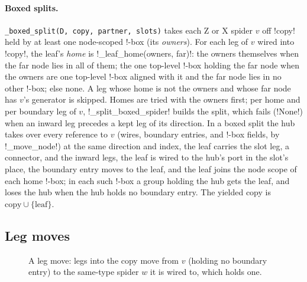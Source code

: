 \paragraph{Boxed splits.} \texttt{\_\allowbreak{}boxed\_\allowbreak{}split(\allowbreak{}D,\allowbreak{} copy,\allowbreak{} partner,\allowbreak{} slots)} takes each Z or X spider $v$ off \code!copy! held by at least one node-scoped !-box (its \emph{owners}). For each leg of $v$ wired into \code!copy!, the leaf's \emph{home} is \py!_leaf_home(owners, far)!: the owners themselves when the far node lies in all of them; the one top-level !-box holding the far node when the owners are one top-level !-box aligned with it and the far node lies in no other !-box; else none. A leg whose home is not the owners and whose far node has $v$'s generator is skipped. Homes are tried with the owners first; per home and per boundary leg of $v$, \py!_split_boxed_spider! builds the split, which fails (\py!None!) when an inward leg precedes a kept leg of its direction. In a boxed split the hub takes over every reference to $v$ (wires, boundary entries, and !-box fields, by \py!_move_node!) at the same direction and index, the leaf carries the slot leg, a connector, and the inward legs, the leaf is wired to the hub's port in the slot's place, the boundary entry moves to the leaf, and the leaf joins the node scope of each home !-box; in each such !-box a group holding the hub gets the leaf, and loses the hub when the hub holds no boundary entry. The yielded copy is $\text{copy}\cup\{\text{leaf}\}$.

\subsection{Leg moves}

\begin{figure}[H]
\centering
{}
\caption{A leg move: legs into the copy move from $v$ (holding no boundary entry) to the same-type spider $w$ it is wired to, which holds one.}\label{fig:kernel-legmove}
\end{figure}


